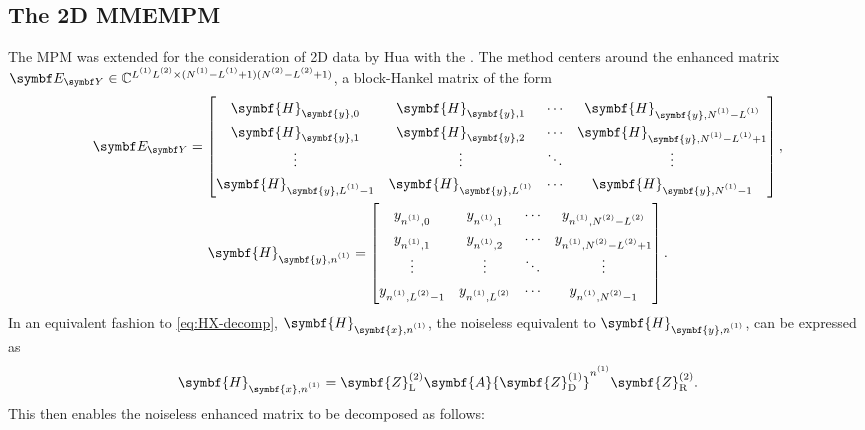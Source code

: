 \subsection{The 2D MMEMPM}
\label{subsec:mmempm}
The \ac{MPM} was extended for the consideration of \ac{2D} data by Hua with the
\cite{Hua1992}. The method centers around the enhanced matrix $\EY
\in \mathbb{C}^{\Lone \Ltwo \times (\None - \Lone + 1)(\Ntwo - \Ltwo + 1)}$,
a block-Hankel matrix of the form
\begin{subequations}
    \begin{gather}
        \EY =
        \begin{bmatrix}
            \symbf{H}_{\symbf{y},0} & \symbf{H}_{\symbf{y},1} & \cdots & \symbf{H}_{\symbf{y},\None - \Lone} \\
            \symbf{H}_{\symbf{y},1} & \symbf{H}_{\symbf{y},2} & \cdots & \symbf{H}_{\symbf{y},\None - \Lone + 1} \\
            \vdots & \vdots & \ddots & \vdots \\
            \symbf{H}_{\symbf{y},\Lone - 1} & \symbf{H}_{\symbf{y},\Lone} & \cdots & \symbf{H}_{\symbf{y},\None - 1}
        \end{bmatrix}, \\
        \def\arraystretch{1.3}
        \symbf{H}_{\symbf{y},\none} =
        \begin{bmatrix}
            y_{ \none, 0 } & y_{ \none, 1 } & \cdots & y_{ \none, \Ntwo - \Ltwo } \\
            y_{ \none, 1 } & y_{ \none, 2 } & \cdots & y_{ \none, \Ntwo - \Ltwo + 1 } \\
            \vdots & \vdots & \ddots & \vdots \\
            y_{ \none, \Ltwo - 1 } & y_{ \none, \Ltwo } & \cdots & y_{ \none, \Ntwo - 1 }
        \end{bmatrix}.
    \end{gather}
\end{subequations}
In an equivalent fashion to \cref{eq:HX-decomp},
$\symbf{H}_{\symbf{x},\none}$, the noiseless equivalent to
$\symbf{H}_{\symbf{y},\none}$, can be expressed as
\begin{equation}
    \symbf{H}_{\symbf{x},\none} =
        \symbf{Z}^{(2)}_{\text{L}}
        \symbf{A}
        {\symbf{Z}^{(1)}_{\text{D}}}^{\none}
        \symbf{Z}^{(2)}_{\text{R}}.
\end{equation}
This then enables the noiseless enhanced matrix to be decomposed as follows:
